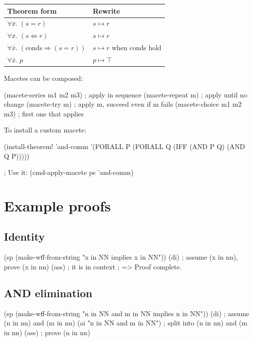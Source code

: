 \documentclass{amsbook}[openany]
\theoremstyle{definition}
\theoremstyle{remark}
\theoremstyle{remark}
\begin{document}
\begin{center}
\begin{tabular}{ll}
\toprule
Theorem form & Rewrite \\
\midrule
$\forall\bar{x}.\;(s = r)$ & $s \mapsto r$ \\
$\forall\bar{x}.\;(s \Leftrightarrow r)$ & $s \mapsto r$ \\
$\forall\bar{x}.\;(\text{conds} \Rightarrow (s = r))$ & $s \mapsto r$ when conds hold \\
$\forall\bar{x}.\;p$ & $p \mapsto \top$ \\
\bottomrule
\end{tabular}
\end{center}

Macetes can be composed:
\begin{VNBcode}
(macete-series m1 m2 m3)   ; apply in sequence
(macete-repeat m)           ; apply until no change
(macete-try m)              ; apply m, succeed even if m fails
(macete-choice m1 m2 m3)   ; first one that applies
\end{VNBcode}

To install a custom macete:
\begin{VNBcode}
(install-theorem! 'and-comm
  '(FORALL P (FORALL Q (IFF (AND P Q) (AND Q P)))))

; Use it:
(cmd-apply-macete ps 'and-comm)
\end{VNBcode}

\section{Example proofs}

\subsection{Identity}

\begin{VNBcode}
(sp (make-wff-from-string "x in NN implies x in NN"))
(di)    ; assume (x in nn), prove (x in nn)
(ass)   ; it is in context
; => Proof complete.
\end{VNBcode}

\subsection{AND elimination}

\begin{VNBcode}
(sp (make-wff-from-string "n in NN and m in NN implies n in NN"))
(di)                          ; assume (n in nn) and (m in nn)
(ai "n in NN and m in NN")   ; split into (n in nn) and (m in nn)
(ass)                         ; prove (n in nn)
\end{VNBcode}
\end{document}
